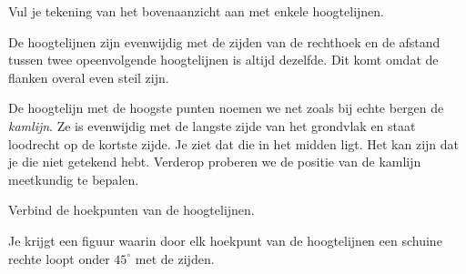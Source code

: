 \documentclass{ximera}
\begin{document}
\begin{exercise}
    Vul je tekening van het bovenaanzicht aan met enkele hoogtelijnen.
    \begin{oplossing}
        De hoogtelijnen zijn evenwijdig met de zijden van de rechthoek en de afstand tussen
        twee opeenvolgende hoogtelijnen is altijd dezelfde. Dit komt omdat de flanken overal
        even steil zijn.
    \end{oplossing}
\end{exercise}


De hoogtelijn met de hoogste punten noemen we \textemdash{} net zoals bij echte bergen
\textemdash{} de \emph{kamlijn}. Ze is evenwijdig met de langste zijde van het grondvlak
en staat loodrecht op de kortste zijde. Je ziet dat die in het midden ligt. Het kan zijn
dat je die niet getekend hebt. Verderop proberen we de positie van de kamlijn meetkundig
te bepalen.

\begin{exercise}
    Verbind de hoekpunten van de hoogtelijnen.
    \begin{oplossing}
        Je krijgt een figuur waarin door elk hoekpunt van de hoogtelijnen een schuine
        rechte loopt onder \(45^\circ\) met de zijden.
    \end{oplossing}
\end{exercise}

\end{document}
